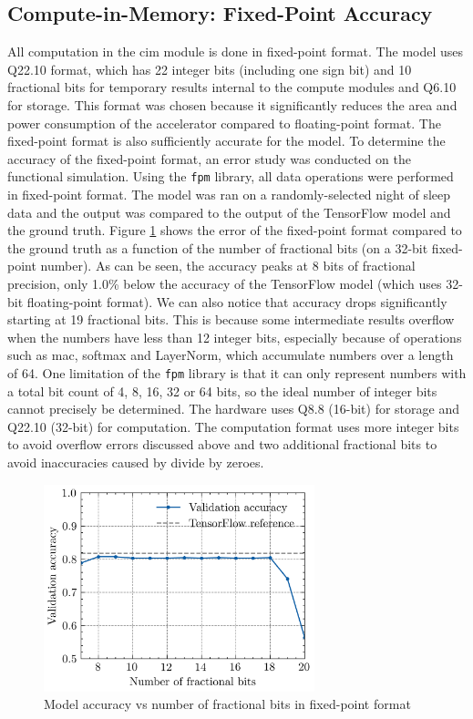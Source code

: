 \subsection{Compute-in-Memory: Fixed-Point Accuracy}
All computation in the \ac{cim} module is done in fixed-point format. The model uses Q22.10 format, which has 22 integer bits (including one sign bit) and 10 fractional bits for 
temporary results internal to the compute modules and Q6.10 for storage. This format was chosen because it significantly reduces the area and power consumption of the accelerator compared
to floating-point format. The fixed-point format is also sufficiently accurate for the model. To determine the accuracy of the fixed-point format, an error study was conducted on the
functional simulation. Using the \texttt{fpm} library, all data operations were performed in fixed-point format. The model was ran on a randomly-selected night of sleep data and the output
was compared to the output of the TensorFlow model and the ground truth. Figure \ref{fig:fixed_point_error} shows the error of the fixed-point format compared to the ground truth as a
function of the number of fractional bits (on a 32-bit fixed-point number). As can be seen, the accuracy peaks at 8 bits of fractional precision, only 1.0\% below the accuracy of the
TensorFlow model (which uses 32-bit floating-point format). We can also notice that accuracy drops significantly starting at 19 fractional bits. This is because some intermediate results
overflow when the numbers have less than 12 integer bits, especially because of operations such as \ac{mac}, softmax and LayerNorm, which accumulate numbers over a length of 64. One
limitation of the \texttt{fpm} library is that it can only represent numbers with a total bit count of 4, 8, 16, 32 or 64 bits, so the ideal number of integer bits cannot precisely be
determined. The hardware uses Q8.8 (16-bit) for storage and Q22.10 (32-bit) for computation. The computation format uses more integer bits to avoid overflow errors discussed above and
two additional fractional bits to avoid inaccuracies caused by divide by zeroes.

\begin{figure}
    \centering
    \includegraphics[width=0.7\textwidth]{assets/fixed_point_acc/fixed_point_acc.png}
    \caption{Model accuracy vs number of fractional bits in fixed-point format}
    \label{fig:fixed_point_error}
\end{figure}

